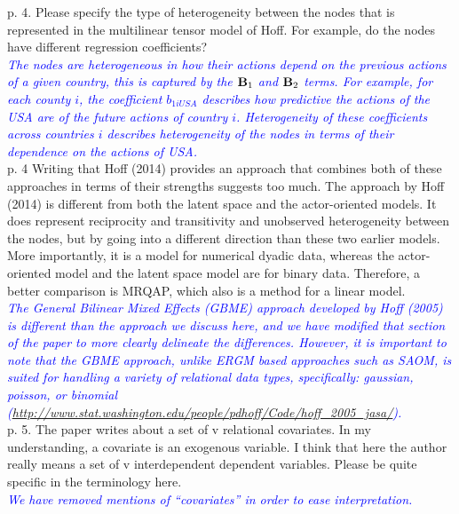 p. 4. Please specify the type of heterogeneity between the nodes that is represented in the multilinear tensor model of Hoff. For example, do the nodes have different regression coefficients? \\

\textcolor{blue}{\emph{
	The nodes are heterogeneous in how their actions depend on the previous actions of a given country, this is captured by the ${\mathbf B}_{1}$ and ${\mathbf B}_{2}$ terms. For example, for each county $i$, the coefficient $b_{1iUSA}$ describes how predictive the actions of the USA are of the future actions of country $i$. Heterogeneity of these coefficients across countries $i$ describes heterogeneity of the nodes in terms of their dependence on the actions of USA.
}} \\

p. 4 Writing that Hoff (2014) provides an approach that combines both of these approaches in terms of their strengths suggests too much. The approach by Hoff (2014) is different from both the latent space and the actor-oriented models. It does represent reciprocity and transitivity and unobserved heterogeneity between the nodes, but by going into a different direction than these two earlier models. More importantly, it is a model for numerical dyadic data, whereas the actor-oriented model and the latent space model are for binary data. Therefore, a better comparison is MRQAP, which also is a method for a linear model. \\

\textcolor{blue}{\emph{
	The General Bilinear Mixed Effects (GBME) approach developed by Hoff (2005) is different than the approach we discuss here, and we have modified that section of the paper to more clearly delineate the differences. However, it is important to note that the GBME approach, unlike ERGM based approaches such as SAOM, is suited for handling a variety of relational data types, specifically: gaussian, poisson, or binomial (\url{http://www.stat.washington.edu/people/pdhoff/Code/hoff_2005_jasa/}). 
}} \\

p. 5. The paper writes about a set of v relational covariates. In my understanding, a covariate is an exogenous variable. I think that here the author really means a set of v interdependent dependent variables. Please be quite specific in the terminology here. \\

\textcolor{blue}{\emph{
	We have removed mentions of ``covariates'' in order to ease interpretation. 
}} \\

